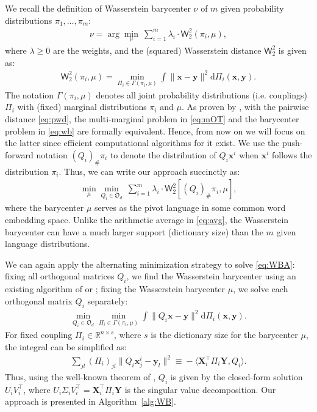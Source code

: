 \documentclass{article}
\newcommand{\RR}{\mathds{R}}
\newcommand{\OO}{\mathfrak{O}}
\newcommand{\xv}{\mathbf{x}}
\newcommand{\yv}{\mathbf{y}}
\newcommand{\Wsf}{\mathsf{W}}
\newcommand{\Xv}{\mathbf{X}}
\newcommand{\Yv}{\mathbf{Y}}
\newcommand{\inner}[2]{\langle #1, #2 \rangle}
\begin{document}
We recall the definition of Wasserstein barycenter $\nu$ of $m$ given probability distributions $\pi_1, \ldots, \pi_m$:
\begin{align}
\label{eq:wb}
\nu = \arg\min_{\mu} ~ \sum_{i=1}^m \lambda_i \cdot \Wsf_2^2(\pi_i, \mu),
\end{align}
where $\lambda \geq 0$ are the weights, and the (squared) Wasserstein distance $\Wsf_2^2$ is given as:
\begin{align}
\!\! \! \Wsf_2^2(\pi_i, \mu) \!=\!\! \min_{\Pi_i \in \Gamma(\pi_i, \mu)} \int \!\!\! \|\xv - \yv\|^2 \mathrm{d} \Pi_i(\xv, \yv). \!\!
\end{align}
The notation $\Gamma(\pi_i,\mu)$ denotes all joint probability distributions (i.e. couplings) $\Pi_i$ with (fixed) marginal distributions $\pi_i$ and $\mu$.
As proven by \citet{agueh2011barycenter}, with the pairwise distance \eqref{eq:pwd}, the multi-marginal problem in \eqref{eq:mOT} and the barycenter problem in  \eqref{eq:wb} are formally equivalent. Hence, from now on we will focus on the latter since efficient computational algorithms for it exist. We use the push-forward notation $(Q_i)_\# \pi_i$ to denote the distribution of $Q_i\xv^i$ when $\xv^i$ follows the distribution $\pi_i$. Thus, we can write our approach succinctly as:
\begin{align}
\label{eq:WBA}
\min_{\mu} \min_{Q_i\in \OO_d} ~ \sum_{i=1}^m \lambda_i \cdot \Wsf_2^2[(Q_i)_{\#} \pi_i , \mu],
\end{align}
where the barycenter $\mu$ serves as the pivot language in some common word embedding space. Unlike the arithmetic average in \eqref{eq:avg}, the Wasserstein barycenter can have a much larger support (dictionary size) than the $m$ given language distributions.

We can again apply the alternating minimization strategy to solve \eqref{eq:WBA}: fixing all orthogonal matrices $Q_i$, we find the Wasserstein barycenter using an existing algorithm of \cite{cuturi2014fast} or \cite{stochastic-barycenter}; fixing the Wasserstein barycenter $\mu$, we solve each orthogonal matrix $Q_i$ separately:
\begin{align}
\min_{Q_i \in \OO_d} \min_{\Pi_i \in \Gamma(\pi_i, \mu)} \int \|Q_i \xv - \yv\|^2 \mathrm{d} \Pi_i(\xv, \yv).\!
\end{align}
For fixed coupling $\Pi_i \in \RR^{n \times s}$, where $s$ is the dictionary size for the barycenter $\mu$, the integral can be simplified as:
\begin{align}
\!\!\sum\nolimits_{j l} (\Pi_i)_{jl} \|Q_i \xv_{j}^i - \yv_l\|^2 \!\equiv\! - \inner{\Xv_i^\top \Pi_i \Yv}{Q_i}.\!
\end{align}
Thus, using the well-known theorem of \citet{Schonemann1966}, $Q_i$ is given by the closed-form solution $U_iV_i^\top$, where $U_i\Sigma_iV_i^\top = \Xv_i^\top \Pi_i \Yv$ is the singular value decomposition. Our approach is presented in Algorithm~\ref{alg:WB}.
\end{document}

